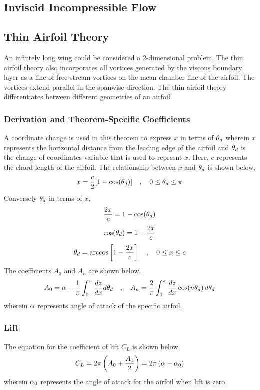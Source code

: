 \documentclass[a4paper, 12pt]{report}
\begin{document}
\begin{center}
\chapter{Inviscid Incompressible Flow}
\begin{comment}
\end{comment}
\section{Thin Airfoil Theory}
\begin{comment}
\end{comment}
An infintely long wing could be considered a $2$-dimensional problem. The thin airfoil theory also incorporates all vortices generated by the viscous boundary layer as a line of free-stream vortices on the mean chamber line of the airfoil. The vortices extend parallel in the spanwise direction. The thin airfoil theory differentiates between different geometries of an airfoil.
\subsection{Derivation and Theorem-Specific Coefficients}
\begin{comment}
\end{comment}
A coordinate change is used in this theorem to express $x$ in terms of $\theta_d$ wherein $x$ represents the horizontal distance from the leading edge of the airfoil and $\theta_d$ is the change of coordinates variable that is used to represnt $x$. Here, $c$ represents the chord length of the airfoil. The relationship between $x$ and $\theta_d$ is shown below,
$$x = \frac{c}{2}[1-\cos(\theta_d)]\quad,\quad 0\leq \theta_d \leq \pi$$
Conversely $\theta_d$ in terms of $x$,
$$\frac{2x}{c} = 1-\cos(\theta_d)$$
$$\cos(\theta_d)= 1-\frac{2x}{c}$$
$$\theta_d= \arccos\left[1-\frac{2x}{c}\right]\quad,\quad 0\leq x \leq c$$
The coefficients $A_0$ and $A_n$ are shown below,
$$A_0 = \alpha -\frac{1}{\pi}\int^{\pi}_{0}\frac{dz}{dx}d\theta_d\quad,\quad A_n = \frac{2}{\pi}\int^{\pi}_{0}\frac{dz}{dx}\cos(n\theta_d)\,d\theta_d$$
wherein $\alpha$ represents angle of attack of the specific airfoil.
\subsection{Lift}
\begin{comment}
\end{comment}
The equation for the coefficient of lift $C_L$ is shown below,
$$C_L = 2\pi\left(A_0 + \frac{A_1}{2}\right) = 2\pi\left(\alpha-\alpha_0\right)$$
wherein $\alpha_0$ represents the angle of attack for the airfoil when lift is zero.

\end{center}
\end{document}
